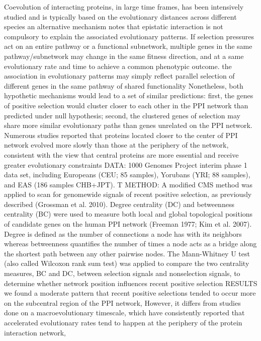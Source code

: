 Coevolution of interacting proteins, in large time frames, has been intensively studied and is typically based on the evolutionary distances across different species  \cite{qian2015recent}
an alternative mechanism notes that epistatic interaction is not compulsory to explain the associated evolutionary patterns. If selection pressures act on an entire pathway or a functional subnetwork, multiple genes in the same pathway/subnetwork may change in the same fitness direction, and at a same evolutionary rate and time to achieve a common phenotypic outcome.  \cite{qian2015recent}
the association in evolutionary patterns may simply reflect parallel selection of different genes in the same pathway of shared functionality  \cite{qian2015recent}
Nonetheless, both hypothetic mechanisms would lead to a set of similar predictions: first, the genes of positive selection would cluster closer to each other in the PPI network than predicted under null hypothesis; second, the clustered genes of selection may share more similar evolutionary paths than genes unrelated on the PPI network. \cite{qian2015recent}
Numerous studies reported that proteins located closer to the center of PPI network evolved more slowly than those at the periphery of the network, consistent with the view that central proteins are more essential and receive greater evolutionary constraints \cite{qian2015recent}
DATA: 1000 Genomes Project interim phase 1 data set, including Europeans (CEU; 85 samples), Yorubans (YRI; 88 samples), and EAS (186 samples CHB+JPT). T \cite{qian2015recent}
METHOD:  \cite{qian2015recent}
	A modified CMS method was applied to scan for genomewide signals of recent positive selection, as previously described (Grossman et al. 2010). \cite{qian2015recent}
	Degree centrality (DC) and betweenness centrality (BC) were used to measure both local and global topological positions of candidate genes on the human PPI network (Freeman 1977; Kim et al. 2007). Degree is defined as the number of connections a node has with its neighbors whereas betweenness quantifies the number of times a node acts as a bridge along the shortest path between any other pairwise nodes.  \cite{qian2015recent}
	The Mann-Whitney U test (also called Wilcoxon rank sum test) was applied to compare the two centrality measures, BC and DC, between selection signals and nonselection signals, to determine whether network position influences recent positive selection \cite{qian2015recent}
RESULTS \cite{qian2015recent}
	we found a moderate pattern that recent positive selections tended to occur more on the subcentral region of the PPI network, \cite{qian2015recent}
	 However, it differs from studies done on a macroevolutionary timescale, which have consistently reported that accelerated evolutionary rates tend to happen at the periphery of the protein interaction network, \cite{qian2015recent}



